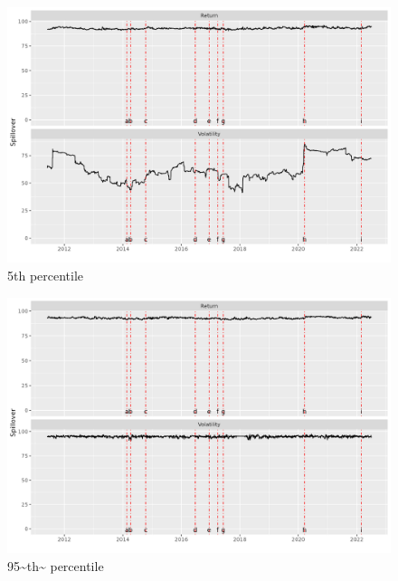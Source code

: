 \documentclass[
  number]{elsarticle}
\begin{document}
\begin{figure}[H]

{\centering \includegraphics{plots/fig-TCI5.png}

}

\caption{\label{fig-TCI5}5th percentile}

\end{figure}

\begin{figure}[H]

{\centering \includegraphics{plots/fig-TCI95.png}

}

\caption{\label{fig-TCI95}95\textasciitilde th\textasciitilde{}
percentile}

\end{figure}
\end{document}
